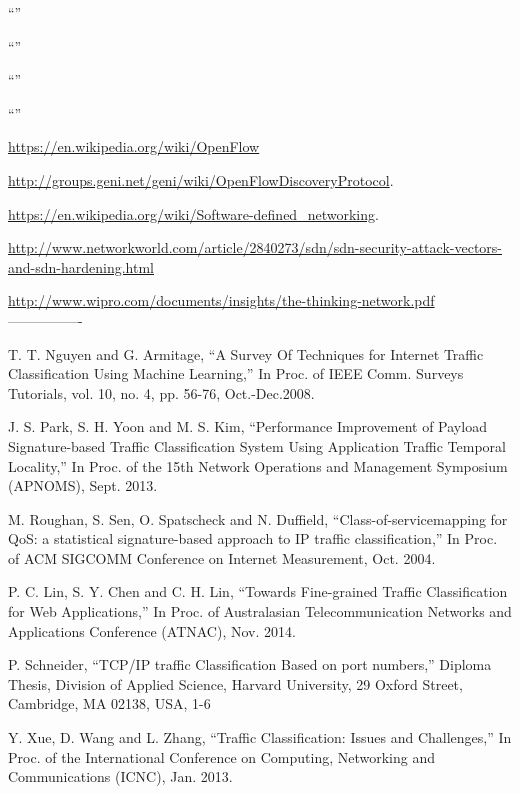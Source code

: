 \begin{thebibliography}{1}
\bibitem{}
``''

\bibitem{}
``''

\bibitem{}
``''

\bibitem{}
``''

\url{https://en.wikipedia.org/wiki/OpenFlow}

\url{http://groups.geni.net/geni/wiki/OpenFlowDiscoveryProtocol}.

\url{https://en.wikipedia.org/wiki/Software-defined_networking}.

\url{http://www.networkworld.com/article/2840273/sdn/sdn-security-attack-vectors-and-sdn-hardening.html}

\url{http://www.wipro.com/documents/insights/the-thinking-network.pdf}
----------------

T. T. Nguyen and G. Armitage, 
``A Survey Of Techniques for Internet Traffic Classification Using Machine Learning,'' In Proc. of IEEE Comm. Surveys Tutorials, vol. 10, no. 4, pp. 56-76, Oct.-Dec.2008.

J. S. Park, S. H. Yoon and M. S. Kim,
``Performance Improvement of Payload Signature-based Traffic Classification System Using Application Traffic Temporal Locality,'' In Proc. of the 15th Network Operations and Management Symposium (APNOMS), Sept. 2013. 

M. Roughan, S. Sen, O. Spatscheck and N. Duffield, 
``Class-of-servicemapping for QoS: a statistical signature-based approach to IP traffic classification,''  In Proc. of ACM SIGCOMM Conference on Internet Measurement, Oct. 2004.

P. C. Lin, S. Y. Chen and C. H. Lin, 
``Towards Fine-grained Traffic Classification for Web Applications,'' In Proc. of Australasian Telecommunication Networks and Applications Conference (ATNAC), Nov. 2014.

P. Schneider,
``TCP/IP traffic Classification Based on port numbers,'' Diploma Thesis, Division of Applied Science, Harvard University, 29 Oxford Street, Cambridge, MA 02138, USA, 1-6

Y. Xue, D. Wang and L. Zhang,
``Traffic Classification: Issues and Challenges,'' In Proc. of the International Conference on Computing, Networking and Communications (ICNC), Jan. 2013.



\end{thebibliography}
